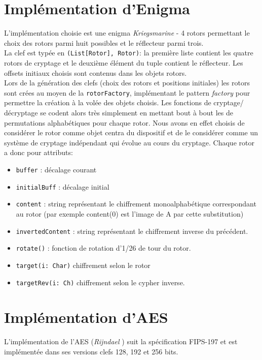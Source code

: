 \documentclass[11pt]{article} %
\begin{document}
\section{Implémentation d'Enigma}
L’implémentation choisie est une enigma \emph{Kriegsmarine} - 4 rotors permettant le choix des rotors parmi huit possibles et le réflecteur parmi trois.  \\
La clef est typée en \texttt{(List[Rotor], Rotor)}: la première liste contient les quatre rotors de cryptage et le deuxième élément du tuple contient le réflecteur. Les offsets initiaux choisis sont contenus dans les objets rotors.\\

Lors de la génération des clefs (choix des rotors et positions initiales) les rotors sont crées au moyen de la \texttt{rotorFactory}, implémentant le pattern \emph{factory} pour permettre la création à la volée des objets choisis.  Les fonctions de cryptage/ décryptage se codent alors très simplement en mettant bout à bout les  de permutations alphabétiques pour chaque rotor. Nous avons en effet choisis de considérer le rotor comme objet centra du dispositif et de le considérer comme un système de cryptage indépendant qui évolue au cours du cryptage. Chaque rotor a donc pour attributs: 
\begin{itemize}
  \item \texttt{buffer} : décalage courant
  \item \texttt{initialBuff}  : décalage initial
  \item \texttt{content}   : string représentant le chiffrement monoalphabétique correspondant au rotor (par exemple content(0) est l'image de A par cette substitution) 
  \item \texttt{invertedContent} : string représentant le chiffrement inverse du précédent.
  \item \texttt{rotate()} : fonction de rotation d'1/26 de tour du rotor.
  \item \texttt{target(i: Char)}  chiffrement selon le rotor
  \item \texttt{targetRev(i: Ch)} chiffrement selon le cypher inverse.

\end{itemize}

\section{Implémentation d'AES}
L'implémentation de l'AES (\emph{Rijndael} ) suit la spécification FIPS-197  et est implémentée dans ses versions clefs 128, 192 et 256 bits.
\end{document}
